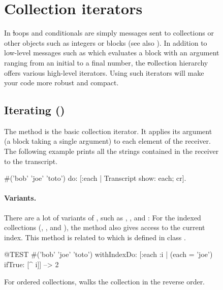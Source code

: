 \documentclass[a4paper,10pt,twoside]{book}
\begin{document}
\begin{figure}
\begin{center}
\section{Collection iterators}
\label{sec:iterators}

In \st loops and conditionals are simply messages sent to collections or other objects such as integers or blocks (see also ).
In addition to low-level messages such as  which evaluates a block with an argument ranging from an initial to a final number, the \st collection hierarchy offers various high-level iterators.
Using such iterators will make your code more robust and compact. 

\subsection{Iterating ()}
The method  is the basic collection iterator.
It applies its argument (a block taking a single argument) to each element of the receiver.
The following example prints all the strings contained in the receiver to the transcript.

\begin{code}{}
#('bob' 'joe' 'toto') do: [:each | Transcript show: each; cr].
\end{code}

\paragraph{Variants.}
There are a lot of variants of , such as \mbox{,} \mbox{}, and :
For the indexed collections (, , and ), the method  also gives access to the current index.
This method is related to  which is defined in class .

\begin{code}{@TEST}
#('bob' 'joe' 'toto') withIndexDo: [:each :i | (each = 'joe') ifTrue: [^ i]] --> 2
\end{code}

For ordered collections,  walks the collection in the reverse order. 


\end{center}
\end{figure}
\end{document}
